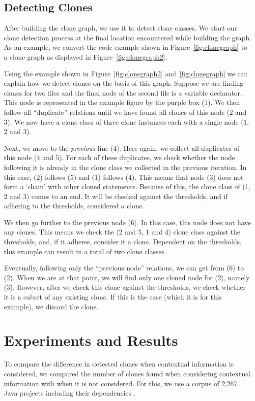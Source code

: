 \documentclass[conference]{IEEEtran}
\begin{document}
\subsection{Detecting Clones} \label{sec:detectingclones}
After building the clone graph, we use it to detect clone classes. We start our clone detection process at the final location encountered while building the graph. As an example, we convert the code example shown in Figure~\ref{fig:clonegraph} to a clone graph as displayed in Figure~\ref{fig:clonegraph2}.

Using the example shown in Figure~\ref{fig:clonegraph2} and~\ref{fig:clonegraph} we can explain how we detect clones on the basis of this graph. Suppose we are finding clones for two files and the final node of the second file is a variable declarator. This node is represented in the example figure by the purple box (1). We then follow all ``duplicate'' relations until we have found all clones of this node (2 and 3). We now have a clone class of three clone instances each with a single node (1, 2 and 3).

Next, we move to the \textit{previous} line (4). Here again, we collect all duplicates of this node (4 and 5). For each of these duplicates, we check whether the node following it is already in the clone class we collected in the previous iteration. In this case, (2) follows (5) and (1) follows (4). This means that node (3) does not form a `chain' with other cloned statements. Because of this, the clone class of (1, 2 and 3) comes to an end. It will be checked against the thresholds, and if adhering to the thresholds, considered a clone.

We then go further to the previous node (6). In this case, this node does not have any clones. This means we check the (2 and 5, 1 and 4) clone class against the thresholds, and, if it adheres, consider it a clone. Dependent on the thresholds, this example can result in a total of two clone classes.

Eventually, following only the ``previous node'' relations, we can get from (6) to (2). When we are at that point, we will find only one cloned node for (2), namely (3). However, after we check this clone against the thresholds, we check whether it is a subset of any existing clone. If this is the case (which it is for this example), we discard the clone.

\section{Experiments and Results}
To compare the difference in detected clones when contextual information is considered, we compared the number of clones found when considering contextual information with when it is not considered. For this, we use a corpus of 2,267 Java projects including their dependencies \cite{baars2019towards}.
\end{document}

